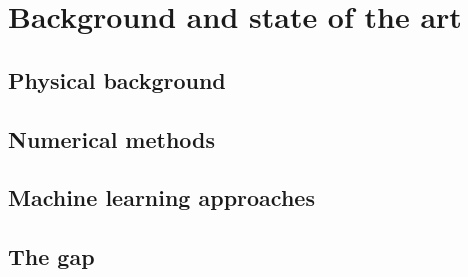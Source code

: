
\section{Background and state of the art}
\label{sec:background}


\subsection{Physical background}
\label{sec:physics-background}


\subsection{Numerical methods}
\label{sec:numerics-background}


\subsection{Machine learning approaches}
\label{sec:ml-background}


\subsection{The gap}
\label{sec:gap}

